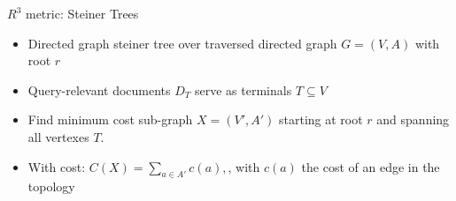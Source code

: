 
\begin{frame}{$R^{3}$ metric: Steiner Trees}
    \begin{itemize}
        \item Directed graph steiner tree over traversed directed graph $G = (V, A)$ with root $r$
        \item Query-relevant documents $D_{T}$ serve as terminals $T \subseteq V$
        \item Find minimum cost sub-graph $X = (V', A')$ starting at root $r$ and spanning all vertexes $T$.
        \item With cost: $ C(X) = \sum\nolimits_{a \in A'} c(a), $, with $c(a)$ the cost of an edge in the topology
    \end{itemize}
\end{frame}
